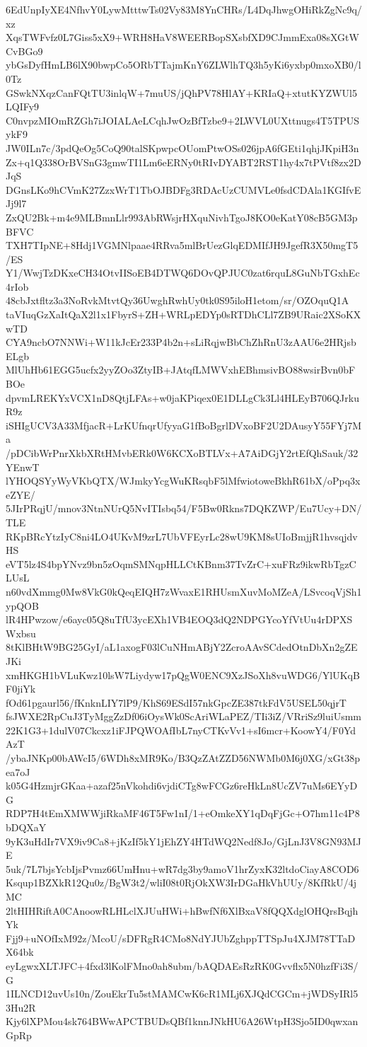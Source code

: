 6EdUnpIyXE4NfhvY0LywMtttwTs02Vy83M8YnCHRs/L4DqJhwgOHiRkZgNc9q/xz
XqsTWFvfz0L7Giss5xX9+WRH8HaV8WEERBopSXsbfXD9CJmmExa08sXGtWCvBGo9
ybGsDyfHmLB6lX90bwpCo5ORbTTajmKnY6ZLWlhTQ3h5yKi6yxbp0mxoXB0/l0Tz
GSwkNXqzCanFQtTU3inlqW+7muUS/jQhPV78HlAY+KRIaQ+xtutKYZWUl5LQIFy9
C0nvpzMIOmRZGh7iJOIALAeLCqhJwOzBfTzbe9+2LWVL0UXttnugs4T5TPUSykF9
JW0ILn7c/3pdQeOg5CoQ90talSKpwpcOUomPtwOSs026jpA6fGEti1qhjJKpiH3n
Zx+q1Q338OrBVSnG3gmwTI1Lm6eERNy0tRIvDYABT2RST1hy4x7tPVtf8zx2DJqS
DGnsLKo9hCVmK27ZzxWrT1TbOJBDFg3RDAcUzCUMVLe0fsdCDAla1KGIfvEJj9l7
ZxQU2Bk+m4e9MLBmnLlr993AbRWsjrHXquNivhTgoJ8KO0eKatY08cB5GM3pBFVC
TXH7TIpNE+8Hdj1VGMNlpaae4RRva5mlBrUezGlqEDMIfJH9JgefR3X50mgT5/ES
Y1/WwjTzDKxeCH34OtvIISoEB4DTWQ6DOvQPJUC0zat6rquL8GuNbTGxhEc4rIob
48cbJxtfltz3a3NoRvkMtvtQy36UwghRwhUy0tk0S95iloH1etom/sr/OZOquQ1A
taVIuqGzXaItQaX2l1x1FbyrS+ZH+WRLpEDYp0sRTDhCLl7ZB9URaic2XSoKXwTD
CYA9ncbO7NNWi+W11kJcEr233P4b2n+sLiRqjwBbChZhRnU3zAAU6e2HRjsbELgb
MlUhHb61EGG5ucfx2yyZOo3ZtyIB+JAtqfLMWVxhEBhmsivBO88wsirBvn0bFBOe
dpvmLREKYxVCX1nD8QtjLFAs+w0jaKPiqex0E1DLLgCk3Ll4HLEyB706QJrkuR9z
iSHIgUCV3A33MfjacR+LrKUfnqrUfyyaG1fBoBgrlDVxoBF2U2DAusyY55FYj7Ma
/pDCibWrPnrXkbXRtHMvbERk0W6KCXoBTLVx+A7AiDGjY2rtEfQhSauk/32YEnwT
lYHOQSYyWyVKbQTX/WJmkyYcgWuKRsqbF5lMfwiotoweBkhR61bX/oPpq3xeZYE/
5JIrPRqjU/mnov3NtnNUrQ5NvITIsbq54/F5Bw0Rkns7DQKZWP/Eu7Ucy+DN/TLE
RKpBRcYtzIyC8ni4LO4UKvM9zrL7UbVFEyrLc28wU9KM8sUIoBmjjR1hvsqjdvHS
eVT5lz4S4bpYNvz9bn5zOqmSMNqpHLLCtKBnm37TvZrC+xuFRz9ikwRbTgzCLUsL
n60vdXmmg0Mw8VkG0kQeqEIQH7zWvaxE1RHUsmXuvMoMZeA/LSvcoqVjSh1ypQOB
lR4HPwzow/e6ayc05Q8uTfU3ycEXh1VB4EOQ3dQ2NDPGYcoYfVtUu4rDPXSWxbsu
8tKlBHtW9BG25GyI/aL1axogF03lCuNHmABjY2ZcroAAvSCdedOtnDbXn2gZEJKi
xmHKGH1bVLuKwz10lsW7Liydyw17pQgW0ENC9XzJSoXh8vuWDG6/YlUKqBF0jiYk
fOd61pgaurl56/fKnknLIY7lP9/KhS69ESdI57nkGpcZE387tkFdV5USEL50qjrT
fsJWXE2RpCuJ3TyMggZzDf06iOysWk0ScAriWLaPEZ/TIi3iZ/VRriSz9luiUsmm
22K1G3+1dulV07Ckcxz1iFJPQWOAfIbL7nyCTKvVv1+sI6mcr+KoowY4/F0YdAzT
/ybaJNKp00bAWcI5/6WDh8xMR9Ko/B3QzZAtZZD56NWMb0M6j0XG/xGt38pea7oJ
k05G4HzmjrGKaa+azaf25nVkohdi6vjdiCTg8wFCGz6reHkLn8UcZV7uMs6EYyDG
RDP7H4tEmXMWWjiRkaMF46T5Fw1nI/1+eOmkeXY1qDqFjGc+O7hm11c4P8bDQXaY
9yK3uHdIr7VX9iv9Ca8+jKzIf5kY1jEhZY4HTdWQ2Nedf8Jo/GjLnJ3V8GN93MJE
5uk/7L7bjsYcbIjsPvmz66UmHnu+wR7dg3by9amoV1hrZyxK32ltdoCiayA8COD6
Ksqup1BZXkR12Qu0z/BgW3t2/wliI08t0RjOkXW3IrDGaHkVhUUy/8KfRkU/4jMC
2ltHIHRiftA0CAnoowRLHLclXJUuHWi+hBwfNf6XlBxaV8fQQXdglOHQrsBqjhYk
Fjj9+uNOfIxM92z/McoU/sDFRgR4CMo8NdYJUbZghppTTSpJu4XJM78TTaDX64bk
eyLgwxXLTJFC+4fxd3lKolFMno0ah8ubm/bAQDAEsRzRK0Gvvflx5N0hzfFi3S/G
1ILNCD12uvUs10n/ZouEkrTu5stMAMCwK6cR1MLj6XJQdCGCm+jWDSyIRl53Hu2R
Kjy6lXPMou4sk764BWwAPCTBUDsQBf1knnJNkHU6A26WtpH3Sjo5ID0qwxanGpRp

